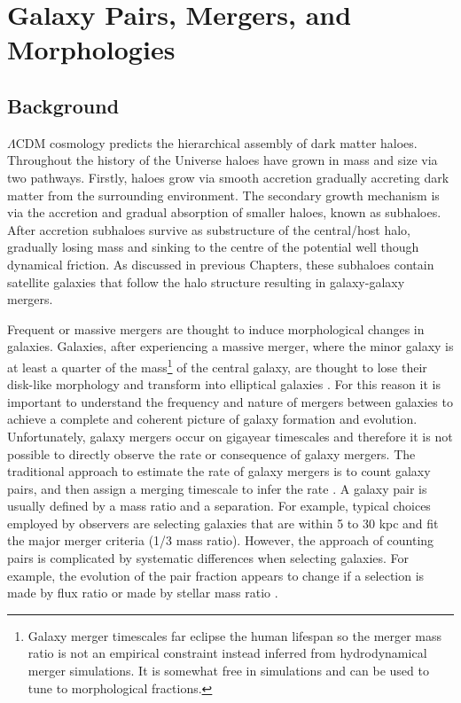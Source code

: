 
\chapter{Galaxy Pairs, Mergers, and Morphologies} 
\label{Chapter:GalPairs}

\section{Background}

$\Lambda$CDM cosmology predicts the hierarchical assembly of dark matter haloes.
Throughout the history of the Universe haloes have grown in mass and size via two pathways. 
Firstly, haloes grow via smooth accretion gradually accreting dark matter from the surrounding environment. 
The secondary growth mechanism is via the accretion and gradual absorption of smaller haloes, known as subhaloes. 
After accretion subhaloes survive as substructure of the central/host halo, gradually losing mass and sinking to the centre of the potential well though dynamical friction. As discussed in previous Chapters, these subhaloes contain satellite galaxies that follow the halo structure resulting in galaxy-galaxy mergers.

Frequent or massive mergers are thought to induce morphological changes in galaxies. 
Galaxies, after experiencing a massive merger, where the minor galaxy is at least a quarter of the mass\footnote{Galaxy merger timescales far eclipse the human lifespan so the merger mass ratio is not an empirical constraint instead inferred from hydrodynamical merger simulations. It is somewhat free in simulations and can be used to tune to morphological fractions.} of the central galaxy, are thought to lose their disk-like morphology and transform into elliptical galaxies \citep{Negroponte1983SimulationsGalaxies, DeLucia2006TheGalaxies}. 
For this reason it is important to understand the frequency and nature of mergers between galaxies to achieve a complete and coherent picture of galaxy formation and evolution. 
Unfortunately, galaxy mergers occur on gigayear timescales and therefore it is not possible to directly observe the rate or consequence of galaxy mergers. 
The traditional approach to estimate the rate of galaxy mergers is to count galaxy pairs, and then assign a merging timescale to infer the rate \citep{Conselice20033,Conselice2008TheField,Mundy2017A3.5,Duncan2019ObservationalFields}.
A galaxy pair is usually defined by a mass ratio and a separation. For example, typical choices employed by observers are selecting galaxies that are within 5 to 30 kpc and fit the major merger criteria (1/3 mass ratio).
However, the approach of counting pairs is complicated by systematic differences when selecting galaxies. For example, the evolution of the pair fraction appears to change if a selection is made by flux ratio or made by stellar mass ratio \citep{Man2016RESOLVING03}.

